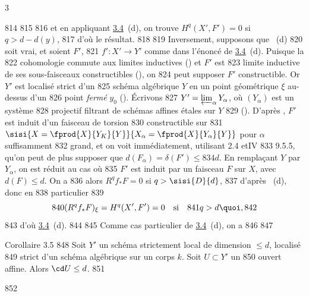 3	\documentclass[10pt]{../fichiers-configuration-latex/smfart}
\begin{document}
   814	%
   815	%
   816	et en appliquant \hyperref[XIV.cor3.4]{3.4}~(d), on trouve $H^{q}(X',F')=0$ si $q>d-d(y)$,
   817	d'où le résultat.
   818	
   819	Inversement, supposons que ~(d) 
   820	soit vrai, et soient $F'$,
   821	$f':X'\rightarrow Y'$ comme dans l'énoncé de \hyperref[XIV.cor3.4]{3.4}~(d). Puisque la
   822	cohomologie commute aux limites inductives () et $F'$ est
   823	limite inductive de ses sous-faisceaux constructibles (), on
   824	peut supposer $F'$ constructible. Or $Y'$ est localisé strict d'un
   825	schéma algébrique $Y$ en un point géométrique $\xi$ au-dessus d'un
   826	point \emph{fermé} $y_{0}$ (). Écrivons
   827	$Y'=\varprojlim_{\alpha} Y_{\alpha}$, où $(Y_{\alpha})$ est un système
   828	projectif filtrant de schémas affines étales sur $Y$ 
   829	(). D'après , $F'$ est induit d'un faisceau de torsion
   830	constructible  sur 
   831	$\sisi{X=\fprod{X}{Y_K}{Y}}{X_\alpha = \fprod{X}{Y_\alpha}{Y}}$ pour $\alpha$ suffisamment
   832	grand, et on voit immédiatement, utilisant 2.4 et\pageoriginale \EGA IV
   833	9.5.5, qu'on peut de plus supposer que $d(F_{\alpha})=\delta(F')\leq
   834	d$. En remplaçant $Y$ par $Y_{\alpha}$, on est réduit au cas où
   835	$F'$ est induit par un faisceau $F$ sur $X$, avec $d(F)\leq d$. On a
   836	alors $R^{q}f_{\ast}F=0$ si $q>\sisi{D}{d}$, 
   837	d'après ~(d), donc en
   838	particulier
   839	$$
   840	(R^{q}f_{\ast}F)_{\xi}=H^{q}(X',F')=0\quad{\mbox{\rm si}}\quad
   841	q>d{\quoi},
   842	$$
   843	d'où \hyperref[XIV.cor3.4]{3.4}~(d).
   844	 
   845	Comme cas particulier de \hyperref[XIV.cor3.4]{3.4}~(d), on a
   846	
   847	\begin{enonce*}{Corollaire 3.5}
   848	Soit $Y'$ un schéma strictement local de dimension $\leq d$, localisé
   849	strict d'un schéma algébrique sur un corps $k$. Soit $U\subset Y'$ un
   850	ouvert affine. Alors $\cd U\leq d$.
   851	\end{enonce*}
   852	
\end{document}
